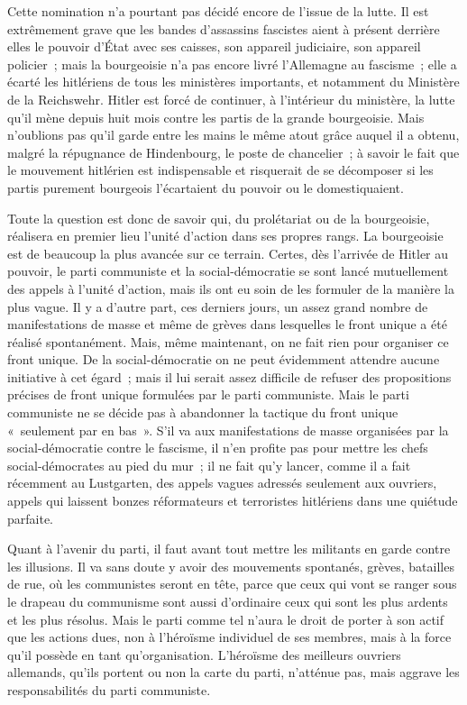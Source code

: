 \documentclass[french,twoside]{book} %
\begin{document}
Cette nomination n'a pourtant pas décidé encore de l'issue de la lutte. Il est extrêmement grave que les bandes d'assassins fascistes aient à présent derrière elles le pouvoir d'État avec ses caisses, son appareil judiciaire, son appareil policier ; mais la bourgeoisie n'a pas encore livré l'Allemagne au fascisme ; elle a écarté les hitlériens de tous les ministères importants, et notamment du Ministère de la Reichswehr. Hitler est forcé de continuer, à l'intérieur du ministère, la lutte qu'il mène depuis huit mois contre les partis de la grande bourgeoisie. Mais n'oublions pas qu'il garde entre les mains le même atout grâce auquel il a obtenu, malgré la répugnance de Hindenbourg, le poste de chancelier ; à savoir le fait que le mouvement hitlérien est indispensable et risquerait de se décomposer si les partis purement bourgeois l'écartaient du pouvoir ou le domestiquaient.\par
Toute la question est donc de savoir qui, du prolétariat ou de la bour­geoisie, réalisera en premier lieu l'unité d'action dans ses propres rangs. La bourgeoisie est de beaucoup la plus avancée sur ce terrain. Certes, dès l'arrivée de Hitler au pouvoir, le parti communiste et la social-démocratie se sont lancé mutuellement des appels à l'unité d'action, mais ils ont eu soin de les formuler de la manière la plus vague. Il y a d'autre part, ces derniers jours, un assez grand nombre de manifestations de masse et même de grèves dans lesquelles le front unique a été réalisé spontanément. Mais, même maintenant, on ne fait rien pour organiser ce front unique. De la social-démocratie on ne peut évidemment attendre aucune initiative à cet égard ; mais il lui serait assez difficile de refuser des propositions précises de front unique formulées par le parti communiste. Mais le parti communiste ne se décide pas à abandonner la tactique du front unique « seulement par en bas ». S'il va aux manifestations de masse organisées par la social-démocratie contre le fascisme, il n'en profite pas pour mettre les chefs social-démocrates au pied du mur ; il ne fait qu'y lancer, comme il a fait récemment au Lustgarten, des appels vagues adressés seulement aux ouvriers, appels qui laissent bonzes réformateurs et terroristes hitlériens dans une quiétude parfaite.\par
Quant à l'avenir du parti, il faut avant tout mettre les militants en garde contre les illusions. Il va sans doute y avoir des mouvements spontanés, grèves, batailles de rue, où les communistes seront en tête, parce que ceux qui vont se ranger sous le drapeau du communisme sont aussi d'ordinaire ceux qui sont les plus ardents et les plus résolus. Mais le parti comme tel n'aura le droit de porter à son actif que les actions dues, non à l'héroïsme individuel de ses membres, mais à la force qu'il possède en tant qu'organisation. L'héroïsme des meilleurs ouvriers allemands, qu'ils portent ou non la carte du parti, n'atténue pas, mais aggrave les responsabilités du parti communiste.\par
\end{document}

